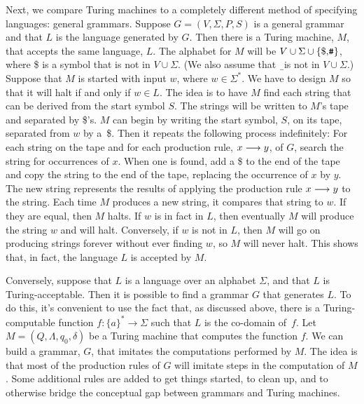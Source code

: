 \medbreak

Next, we compare Turing machines to a completely different method
of specifying languages: general grammars.  Suppose $G=(V,\Sigma,P,S)$ is a general
grammar and that $L$ is the language
generated by $G$.  Then there is a Turing machine, $M$, that accepts
the same language, $L$.  The alphabet for $M$ will be $V\cup\Sigma\cup\{\text{\$,{\tt\#}}\}$,
where \$ is a symbol that is not in $V\cup\Sigma$. (We also assume that \b\ is not in $V\cup\Sigma$.)
Suppose that $M$ is started with input $w$, where $w\in\Sigma^*$.
We have to design $M$ so that it will halt if and only if $w\in L$.
The idea is to have $M$ find each string that can be derived
from the start symbol $S$.  The strings will be written to $M$'s tape
and separated by \$'s.  $M$ can begin by writing the start symbol,
$S$, on its tape, separated from $w$ by a~\$.  Then it repeats
the following process indefinitely:  For each string on the tape
and for each production rule, $x\longrightarrow y$, of $G$, search the
string for occurrences of $x$.  When one is found, add a \$ to the
end of the tape and copy the string to the end of the tape, replacing
the occurrence of $x$ by $y$.  The new string represents the results
of applying the production rule $x\longrightarrow y$ to the string.
Each time $M$ produces a new string, it compares
that string to $w$.  If they are equal, then $M$ halts.  If $w$ is
in fact in $L$, then eventually $M$ will produce the string $w$ and
will halt.  Conversely, if $w$ is not in $L$, then $M$ will go on producing
strings forever without ever finding $w$, so $M$ will never halt.
This shows that, in fact, the language $L$ is accepted by $M$.

Conversely, suppose that $L$ is a language over an alphabet $\Sigma$,
and that $L$ is Turing-acceptable.  Then it is possible to find a grammar
$G$ that generates $L$.  To do this, it's convenient to use the
fact that, as discussed above, there is a Turing-computable function
$f\colon \{a\}^*\to\Sigma$ such that $L$ is the co-domain of~$f$.
Let $M=(Q,\Lambda,q_0,\delta)$ be a Turing machine that computes
the function $f$.  We can build a grammar, $G$, that imitates the computations
performed by $M$.  The idea is that most of the production rules of $G$ will
imitate steps in the computation of $M$.  Some additional rules are added
to get things started, to clean up, and to otherwise bridge the
conceptual gap between grammars and Turing machines.

